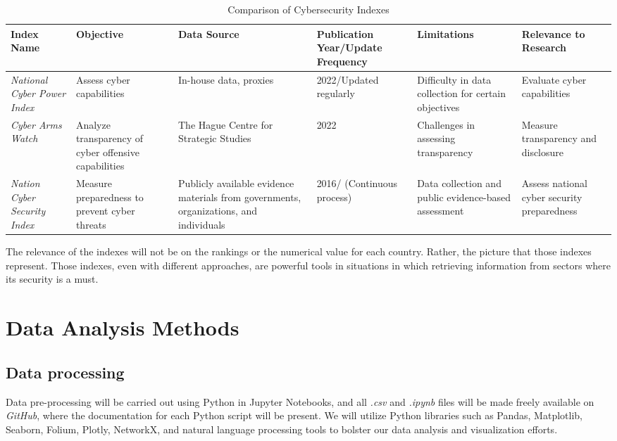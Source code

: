 \begin{table}[htbp]
  \centering
  \caption{Comparison of Cybersecurity Indexes}
  \begin{tabular}{p{1.2cm}p{2.5cm}p{2.5cm}p{2.2cm}p{2.2cm}p{3cm}}
    \toprule
    \textbf{Index Name} &
    \textbf{Objective} &
    \textbf{Data Source} &
    \textbf{Publication Year/Update Frequency} &
    \textbf{Limitations} &
    \textbf{Relevance to Research} \\
    \midrule
    \textit{National Cyber Power Index} &
    Assess cyber capabilities &
    In-house data, proxies &
    2022/Updated regularly &
    Difficulty in data collection for certain objectives &
    Evaluate cyber capabilities \\
    \midrule
    \textit{Cyber Arms Watch} &
    Analyze transparency of cyber offensive capabilities &
    The Hague Centre for Strategic Studies &
    2022 &
    Challenges in assessing transparency &
    Measure transparency and disclosure \\
    \midrule
    \textit{Nation Cyber Security Index}&
    Measure preparedness to prevent cyber threats &
    Publicly available evidence materials from governments, organizations, and individuals &
    2016/ (Continuous process) &
    Data collection and public evidence-based assessment &
    Assess national cyber security preparedness \\
    \bottomrule
  \end{tabular}
\end{table}

The relevance of the indexes will not be on the rankings or the numerical value for each country. Rather, the picture that those indexes represent. Those indexes, even with different approaches, are powerful tools in situations in which retrieving information from sectors where its security is a must. 

\vspace{2cm}
\section{Data Analysis Methods}
\subsection{Data processing}

Data pre-processing will be carried out using Python in Jupyter Notebooks, and all \textit{.csv} and \textit{.ipynb} files will be made freely available on \textit{GitHub}, where the documentation for each Python script will be present. We will utilize Python libraries such as Pandas, Matplotlib, Seaborn, Folium, Plotly, NetworkX, and natural language processing tools to bolster our data analysis and visualization efforts.

